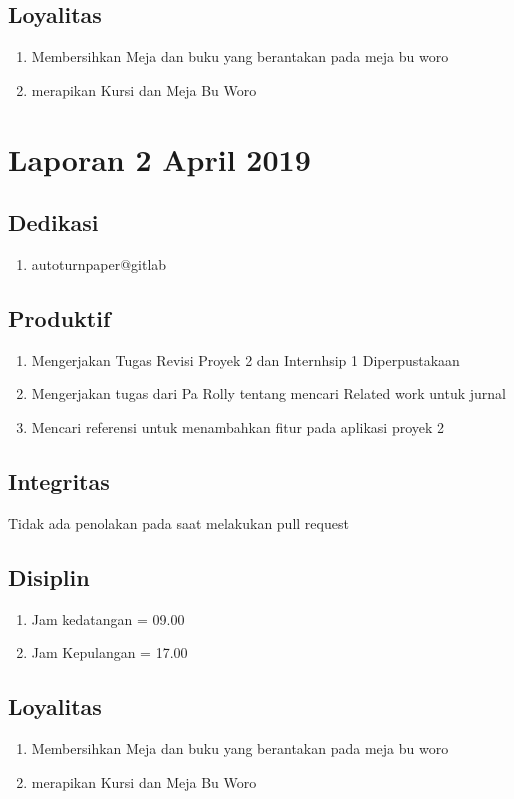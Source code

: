 \subsection{Loyalitas}
\begin{enumerate}
\item Membersihkan Meja dan buku yang berantakan pada meja bu woro
\item merapikan Kursi dan Meja Bu Woro
\end{enumerate}


\section{Laporan 2 April 2019}
\subsection{Dedikasi}
\begin{enumerate}
\item autoturnpaper@gitlab
\end{enumerate}
\subsection{Produktif}
\begin{enumerate}
\item Mengerjakan Tugas Revisi Proyek 2 dan Internhsip 1 Diperpustakaan
\item Mengerjakan tugas dari Pa Rolly tentang mencari Related work untuk jurnal 
\item Mencari referensi untuk menambahkan fitur pada aplikasi proyek 2
\end{enumerate}
\subsection{Integritas}
Tidak ada penolakan pada saat melakukan pull request
\subsection{Disiplin}
\begin{enumerate}
\item Jam kedatangan =  09.00
\item Jam Kepulangan = 17.00
\end{enumerate}
\subsection{Loyalitas}
\begin{enumerate}
\item Membersihkan Meja dan buku yang berantakan pada meja bu woro
\item merapikan Kursi dan Meja Bu Woro
\end{enumerate}

